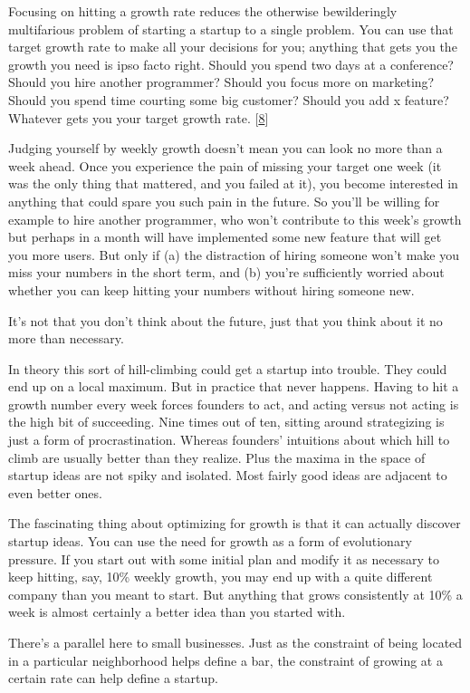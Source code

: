 Focusing on hitting a growth rate reduces the otherwise bewilderingly
multifarious problem of starting a startup to a single problem.
You can use that target growth rate to make all your decisions for
you; anything that gets you the growth you need is ipso facto right.
Should you spend two days at a conference?  Should you hire another
programmer?  Should you focus more on marketing?  Should you spend
time courting some big customer?  Should you add x feature? Whatever
gets you your target growth rate. 
[\href{\#f8n}{8}]

Judging yourself by weekly growth doesn't mean you can look no more
than a week ahead.  Once you experience the pain of missing your
target one week (it was the only thing that mattered, and you failed
at it), you become interested in anything that could spare you such
pain in the future.  So you'll be willing for example to hire another
programmer, who won't contribute to this week's growth but perhaps
in a month will have implemented some new feature that will get you
more users.   But only if (a) the distraction of hiring someone
won't make you miss your numbers in the short term, and (b) you're
sufficiently worried about whether you can keep hitting your numbers
without hiring someone new.

It's not that you don't think about the future, just that you think
about it no more than necessary.

In theory this sort of hill-climbing could get a startup into
trouble.  They could end up on a local maximum.  But in practice
that never happens.  Having to hit a growth number every week forces
founders to act, and acting versus not acting is the high bit of
succeeding.  Nine times out of ten, sitting around strategizing is
just a form of procrastination.  Whereas founders' intuitions about
which hill to climb are usually better than they realize.  Plus the
maxima in the space of startup ideas are not spiky and isolated.
Most fairly good ideas are adjacent to even better ones.

The fascinating thing about optimizing for growth is that it can
actually discover startup ideas.  You can use the need for growth
as a form of evolutionary pressure.  If you start out with some
initial plan and modify it as necessary to keep hitting, say, 10\%
weekly growth, you may end up with a quite different company than
you meant to start.  But anything that grows consistently at 10\% a
week is almost certainly a better idea than you started with.

There's a parallel here to small businesses.  Just as the constraint
of being located in a particular neighborhood helps define a bar,
the constraint of growing at a certain rate can help define a
startup.

